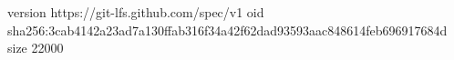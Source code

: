 version https://git-lfs.github.com/spec/v1
oid sha256:3cab4142a23ad7a130ffab316f34a42f62dad93593aac848614feb696917684d
size 22000
